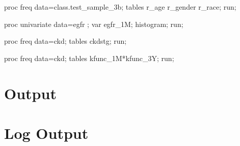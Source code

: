 \documentclass{article}\usepackage[]{graphicx}\usepackage[]{color}
\begin{document}
\begin{Sascode}[store=gfr]
proc freq data=class.test_sample_3b;
tables r_age r_gender r_race;
run;

proc univariate data=egfr ;
var egfr_1M;
histogram;
run;

proc freq data=ckd;
tables ckdstg;
run;

proc freq data=ckd;
tables kfunc_1M*kfunc_3Y;
run;
\end{Sascode}

\section{Output}



\clearpage
\section{Log Output}
\end{document}
